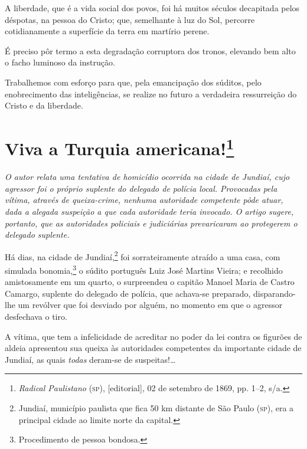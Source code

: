 A liberdade, que é a vida social dos povos, foi há muitos séculos
decapitada pelos déspotas, na pessoa do Cristo; que, semelhante à luz do
Sol, percorre cotidianamente a superfície da terra em martírio perene.

É preciso pôr termo a esta degradação corruptora dos tronos, elevando
bem alto o facho luminoso da instrução.

Trabalhemos com esforço para que, pela emancipação dos súditos, pelo
enobrecimento das inteligências, se realize no futuro a verdadeira
ressurreição do Cristo e da liberdade.

\chapter{Viva a Turquia americana!\footnote{\emph{Radical Paulistano}
  (\textsc{sp}), {[}editorial{]}, 02 de setembro de 1869, pp. 1--2, s/a.}}

\begin{didascalia}\itshape
O autor relata uma tentativa de homicídio ocorrida na cidade de Jundiaí,
cujo agressor foi o próprio suplente do delegado de polícia local.
Provocadas pela vítima, através de queixa-crime, nenhuma autoridade
competente pôde atuar, dada a alegada suspeição a que cada autoridade
teria invocado. O artigo sugere, portanto, que as autoridades policiais
e judiciárias prevaricaram ao protegerem o delegado suplente.
\end{didascalia}



Há dias, na cidade de Jundiaí,\footnote{Jundiaí, município paulista que
  fica 50 km distante de São Paulo (\textsc{sp}), era a principal cidade ao
  limite norte da capital.} foi sorrateiramente atraído a uma casa, com
simulada bonomia,\footnote{Procedimento de pessoa bondosa.} o súdito
português Luiz José Martins Vieira; e recolhido amistosamente em um
quarto, o surpreendeu o capitão Manoel Maria de Castro Camargo, suplente
do delegado de polícia, que achava-se preparado, disparando-lhe um
revólver que foi desviado por alguém, no momento em que o agressor
desfechava o tiro.

A vítima, que tem a infelicidade de acreditar no poder da lei contra os
figurões de aldeia apresentou sua queixa às autoridades competentes da
importante cidade de Jundiaí, as quais \textit{todas} deram-se de suspeitas!\ldots{}

